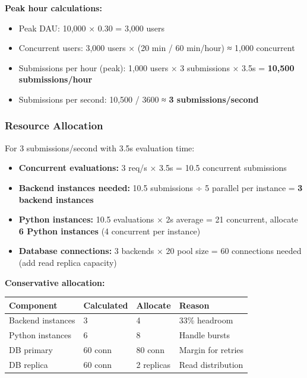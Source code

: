 \documentclass[12pt,a4paper,oneside]{article}
\begin{document}
{{\textbf{Peak hour calculations:}

\begin{itemize}
    \item Peak DAU: 10,000 × 0.30 = 3,000 users
    \item Concurrent users: 3,000 users × (20 min / 60 min/hour) ≈ 1,000 concurrent
    \item Submissions per hour (peak): 1,000 users × 3 submissions × 3.5s = \textbf{10,500 submissions/hour}
    \item Submissions per second: 10,500 / 3600 ≈ \textbf{3 submissions/second}
\end{itemize}

\subsubsection{Resource Allocation}

For 3 submissions/second with 3.5s evaluation time:

\begin{itemize}
    \item \textbf{Concurrent evaluations:} 3 req/s × 3.5s = 10.5 concurrent submissions
    \item \textbf{Backend instances needed:} 10.5 submissions ÷ 5 parallel per instance = \textbf{3 backend instances}
    \item \textbf{Python instances:} 10.5 evaluations × 2s average = 21 concurrent, allocate \textbf{6 Python instances} (4 concurrent per instance)
    \item \textbf{Database connections:} 3 backends × 20 pool size = 60 connections needed (add read replica capacity)
\end{itemize}

\textbf{Conservative allocation:}

\begin{table}[H]
\centering
\begin{tabular}{|p{2.5cm}|p{2cm}|p{2cm}|p{4.5cm}|}
\hline
\textbf{Component} & \textbf{Calculated} & \textbf{Allocate} & \textbf{Reason} \\
\hline
Backend instances & 3 & 4 & 33\% headroom \\
\hline
Python instances & 6 & 8 & Handle bursts \\
\hline
DB primary & 60 conn & 80 conn & Margin for retries \\
\hline
DB replica & 60 conn & 2 replicas & Read distribution \\
\hline
\end{tabular}
\end{table}

}}
\end{document}
